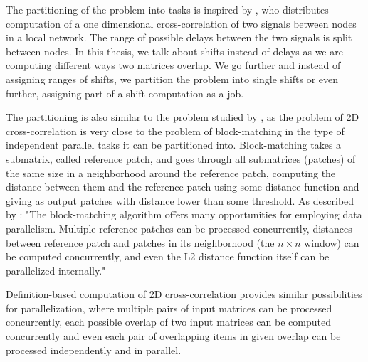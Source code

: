 The partitioning of the problem into tasks is inspired by \citet{paper:cross_corr_tasks}, who distributes computation of a one dimensional cross-correlation of two signals between nodes in a local network. The range of possible delays between the two signals is split between nodes. In this thesis, we talk about shifts instead of delays as we are computing different ways two matrices overlap. We go further and instead of assigning ranges of shifts, we partition the problem into single shifts or even further, assigning part of a shift computation as a job.


The partitioning is also similar to the problem studied by \citet{paper:krulis_3d_block}, as the problem of 2D cross-correlation is very close to the problem of block-matching in the type of independent parallel tasks it can be partitioned into. Block-matching takes a submatrix, called reference patch, and goes through all submatrices (patches) of the same size in a neighborhood around the reference patch, computing the distance between them and the reference patch using some distance function and giving as output patches with distance lower than some threshold. As described by \citet{paper:krulis_3d_block}: "The block-matching algorithm offers many opportunities
for employing data parallelism. Multiple reference patches
can be processed concurrently, distances between reference
patch and patches in its neighborhood (the $n \times n$ window)
can be computed concurrently, and even the L2 distance
function itself can be parallelized internally."

Definition-based computation of 2D cross-correlation provides similar possibilities for parallelization, where multiple pairs of input matrices can be processed concurrently, each possible overlap of two input matrices can be computed concurrently and even each pair of overlapping items in given overlap can be processed independently and in parallel. 

